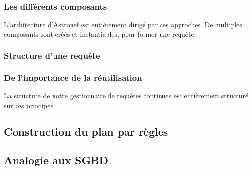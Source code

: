 \subsubsection{Les différents composants}
L'architecture d'Astronef est entièrement dirigé par ces approches. De multiples composants sont créés et instantiables, pour former une requête.

\subsubsection{Structure d'une requête}
\subsubsection{De l'importance de la réutilisation}
La structure de notre gestionnaire de requêtes continues est entièrement structuré sur ces principes.

\subsection{Construction du plan par règles}
\subsection{Analogie aux SGBD}